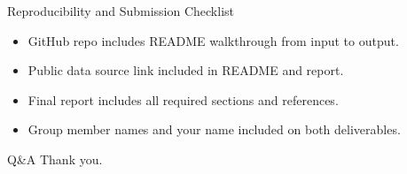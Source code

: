 \documentclass[aspectratio=169]{beamer}
\begin{document}
\begin{frame}{Reproducibility and Submission Checklist}
\begin{itemize}
  \item GitHub repo includes README walkthrough from input to output.
  \item Public data source link included in README and report.
  \item Final report includes all required sections and references.
  \item Group member names and your name included on both deliverables.
\end{itemize}
\end{frame}

\begin{frame}{Q\&A}
\centering
\Large Thank you.
\end{frame}
\end{document}

